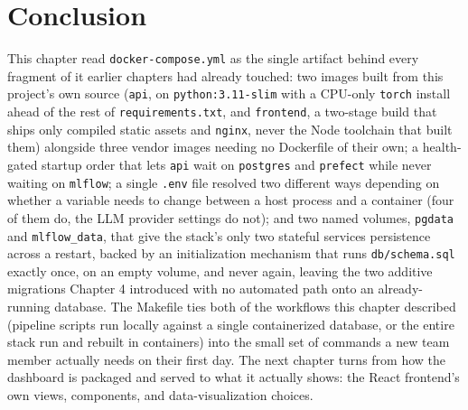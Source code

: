 \section{Conclusion}
\begin{sloppypar}
This chapter read \texttt{docker-compose.yml} as the single artifact behind every fragment of it earlier chapters had already touched: two images built from this project's own source (\texttt{api}, on \texttt{python:3.11-slim} with a CPU-only \texttt{torch} install ahead of the rest of \texttt{requirements.txt}, and \texttt{frontend}, a two-stage build that ships only compiled static assets and \texttt{nginx}, never the Node toolchain that built them) alongside three vendor images needing no Dockerfile of their own; a health-gated startup order that lets \texttt{api} wait on \texttt{postgres} and \texttt{prefect} while never waiting on \texttt{mlflow}; a single \texttt{.env} file resolved two different ways depending on whether a variable needs to change between a host process and a container (four of them do, the LLM provider settings do not); and two named volumes, \texttt{pgdata} and \texttt{mlflow\_data}, that give the stack's only two stateful services persistence across a restart, backed by an initialization mechanism that runs \texttt{db/\allowbreak schema.sql} exactly once, on an empty volume, and never again, leaving the two additive migrations Chapter 4 introduced with no automated path onto an already-running database. The Makefile ties both of the workflows this chapter described (pipeline scripts run locally against a single containerized database, or the entire stack run and rebuilt in containers) into the small set of commands a new team member actually needs on their first day. The next chapter turns from how the dashboard is packaged and served to what it actually shows: the React frontend's own views, components, and data-visualization choices.
\end{sloppypar}
